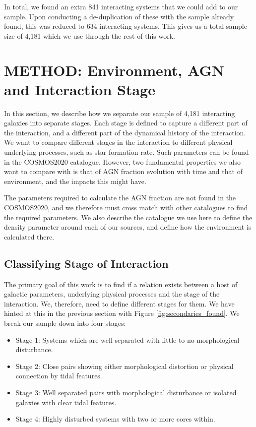 \documentclass[fleqn,usenatbib]{mnras}
\begin{document}
In total, we found an extra 841 interacting systems that we could add to our sample. Upon conducting a de-duplication of these with the sample already found, this was reduced to 634 interacting systems. This gives us a total sample size of 4,181 which we use through the rest of this work.

\section{METHOD: Environment, AGN and Interaction Stage}
In this section, we describe how we separate our sample of 4,181 interacting galaxies into separate stages. Each stage is defined to capture a different part of the interaction, and a different part of the dynamical history of the interaction. We want to compare different stages in the interaction to different physical underlying processes, such as star formation rate. Such parameters can be found in the COSMOS2020 catalogue. However, two fundamental properties we also want to compare with is that of AGN fraction evolution with time and that of environment, and the impacts this might have.

The parameters required to calculate the AGN fraction are not found in the COSMOS2020, and we therefore must cross match with other catalogues to find the required parameters. We also describe the catalogue we use here to define the density parameter around each of our sources, and define how the environment is calculated there.

\subsection{Classifying Stage of Interaction}\label{sec:staging}
The primary goal of this work is to find if a relation exists between a host of galactic parameters, underlying physical processes and the stage of the interaction. We, therefore, need to define different stages for them. We have hinted at this in the previous section with Figure \ref{fig:secondaries_found}. We break our sample down into four stages:

\begin{itemize}
    \item Stage 1: Systems which are well-separated with little to no morphological disturbance.
    \item Stage 2: Close pairs showing either morphological distortion or physical connection by tidal features.
    \item Stage 3: Well separated pairs with morphological disturbance or isolated galaxies with clear tidal features.
    \item Stage 4: Highly disturbed systems with two or more cores within.
\end{itemize}
\end{document}
